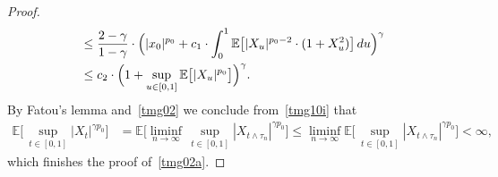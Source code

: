 \documentclass[11pt]{amsart}
\newcommand{\EE}{{\mathbb E}}
\theoremstyle{plain}
\theoremstyle{definition}
\begin{document}
\begin{proof}
\begin{equation}
\begin{aligned}
& \le  \frac{2-\gamma}{1-\gamma} \cdot \Bigl(|x_0|^{p_0}+c_1 \cdot\int_0^1 \EE\bigl[|X_u|^{p_0-2}  \cdot (1+X_u^2)\bigr]\, du\Bigr)^\gamma \\ & \le c_2\cdot  \Bigl(1 + \sup_{u\in[0,1]}\EE\bigl[|X_u|^{p_0}\bigr]\Bigr)^\gamma.
\end{aligned}
\end{equation}
By Fatou's lemma and~\eqref{tmg02} we conclude from~\eqref{tmg10i} that
\begin{align*}
\EE\bigl[\,\sup_{t\in[0,1]}|X_{t}|^{\gamma p_0}\bigr]  &= \EE\bigl[\liminf_{n\to\infty}\,\sup_{t\in[0,1]} |X_{t\wedge \tau_n}|^{\gamma p_0}\bigr] \le \liminf_{n\to\infty} \EE\bigl[\,\sup_{t\in[0,1]} |X_{t\wedge \tau_n}|^{\gamma p_0}\bigr] < \infty,
\end{align*}
which finishes the proof of~\eqref{tmg02a}.



\end{proof}
\end{document}
